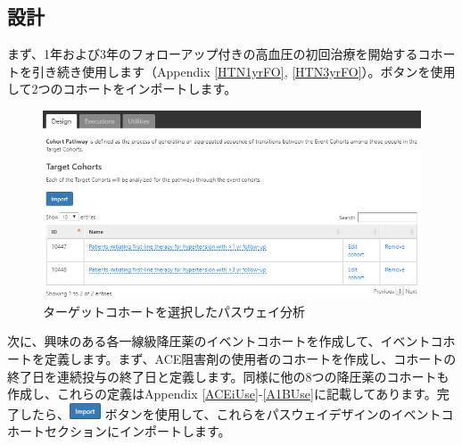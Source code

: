 \documentclass[
  11pt]{book}
\theoremstyle{definition}
\theoremstyle{definition}
\theoremstyle{definition}
\theoremstyle{definition}
\theoremstyle{remark}
\begin{document}
\subsection{設計}\label{ux8a2dux8a08}

まず、1年および3年のフォローアップ付きの高血圧の初回治療を開始するコホートを引き続き使用します（Appendix \ref{HTN1yrFO}, \ref{HTN3yrFO}）。ボタンを使用して2つのコホートをインポートします。

\begin{figure}

{\centering \includegraphics[width=1\linewidth]{images/Characterization/atlasPathwaysTargetCohorts} 

}

\caption{ターゲットコホートを選択したパスウェイ分析}\label{fig:atlasPathwaysTargetCohorts}
\end{figure}

次に、興味のある各一線級降圧薬のイベントコホートを作成して、イベントコホートを定義します。まず、ACE阻害剤の使用者のコホートを作成し、コホートの終了日を連続投与の終了日と定義します。同様に他の8つの降圧薬のコホートも作成し、これらの定義はAppendix \ref{ACEiUse}-\ref{A1BUse}に記載してあります。完了したら、\includegraphics{images/Characterization/atlasImportButton.png} ボタンを使用して、これらをパスウェイデザインのイベントコホートセクションにインポートします。
\end{document}
